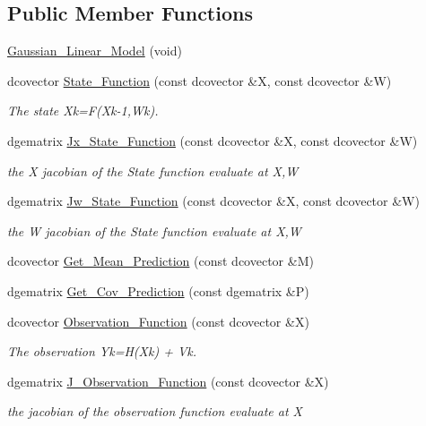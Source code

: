 \subsection*{Public Member Functions}
\begin{CompactItemize}
\item 
\hyperlink{class_gaussian___linear___model_495bfe0a795c2590a8476aff79613fa0}{Gaussian\_\-Linear\_\-Model} (void)
\item 
dcovector \hyperlink{class_gaussian___linear___model_f0d24016df8709697480126c240a16ba}{State\_\-Function} (const dcovector \&X, const dcovector \&W)
\begin{CompactList}\small\item\em The state Xk=F(Xk-1,Wk). \item\end{CompactList}\item 
dgematrix \hyperlink{class_gaussian___linear___model_3fb2cc6feae8997ad99fce7e2b77a2ce}{Jx\_\-State\_\-Function} (const dcovector \&X, const dcovector \&W)
\begin{CompactList}\small\item\em the X jacobian of the State function evaluate at X,W \item\end{CompactList}\item 
dgematrix \hyperlink{class_gaussian___linear___model_0df35cd7199676b9a03feec376aa49e7}{Jw\_\-State\_\-Function} (const dcovector \&X, const dcovector \&W)
\begin{CompactList}\small\item\em the W jacobian of the State function evaluate at X,W \item\end{CompactList}\item 
dcovector \hyperlink{class_gaussian___linear___model_85a8bede33982e2cd2e8433ae3f19ef5}{Get\_\-Mean\_\-Prediction} (const dcovector \&M)
\item 
dgematrix \hyperlink{class_gaussian___linear___model_93e0443c5a897a731f6f3b76d2fda62c}{Get\_\-Cov\_\-Prediction} (const dgematrix \&P)
\item 
dcovector \hyperlink{class_gaussian___linear___model_a6ac01291543509b33bad1160ad7e498}{Observation\_\-Function} (const dcovector \&X)
\begin{CompactList}\small\item\em The observation Yk=H(Xk) + Vk. \item\end{CompactList}\item 
dgematrix \hyperlink{class_gaussian___linear___model_ea76d88935c900fdc3e39775380446dc}{J\_\-Observation\_\-Function} (const dcovector \&X)
\begin{CompactList}\small\item\em the jacobian of the observation function evaluate at X \item\end{CompactList}\end{CompactItemize}
